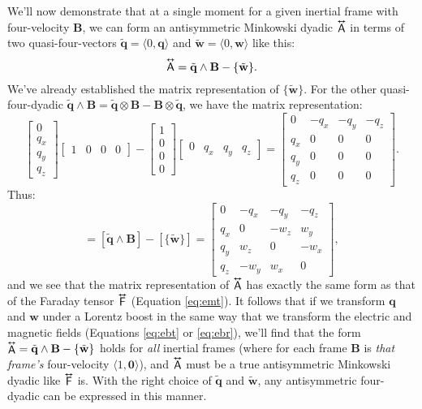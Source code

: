 \documentclass[12pt]{article}
\renewcommand{\vv}[1]{\mathbf{#1}}
\newcommand{\tightoverset}[2]{%
  \mathop{#2}\limits^{\vbox to -.5ex{\kern-0.75ex\hbox{$#1$}\vss}}}
\newcommand{\inlinedy}[1]{\tightoverset{\text{\tiny$\bm\leftrightarrow$}}{#1}}
\newcommand{\capdy}[1]{ \overset{ \text{\tiny$\bm\leftrightarrow$} }{\vphantom{\text{\small{A}}}\smash{#1}} }
\begin{document}
We'll now demonstrate that at a single moment for a given inertial frame with four-velocity $\vv B$, we can form an antisymmetric Minkowski dyadic $\inlinedy{\mathsf{A}}$ in terms of two quasi-four-vectors $\tilde{\vv q} = \langle 0, \vv q \rangle$ and $\tilde{\vv w} = \langle 0, \vv w \rangle$ like this:
\begin{equation*}
\capdy{\mathsf{A}} = \tilde{\vv q} \wedge \vv B - \{ \tilde{\vv w} \}.
\end{equation*}
We've already established the matrix representation of $\{ \tilde{\vv w} \}$. For the other quasi-four-dyadic $\tilde{\vv q} \wedge \vv B = \tilde{\vv q} \otimes \vv B - \vv B \otimes \tilde{\vv q}$, we have the matrix representation:
\begin{equation*}
\begin{bmatrix}
0 \\
q_x \\
q_y \\
q_z
\end{bmatrix}
\begin{bmatrix}
1 & 0 & 0 & 0
\end{bmatrix}
-
\begin{bmatrix}
1 \\
0 \\
0 \\
0
\end{bmatrix}
\begin{bmatrix}
0 & q_x & q_y & q_z
\end{bmatrix}
=
\begin{bmatrix}
0 & -q_x & -q_y & -q_z \\
q_x & 0 & 0 & 0 \\
q_y & 0 & 0 & 0 \\
q_z & 0 & 0 & 0
\end{bmatrix}.
\end{equation*}
Thus:
\begin{equation*}
[\capdy{\mathsf{A}}] = [\tilde{\vv q} \wedge \vv B] - [\{ \tilde{\vv w} \}]
=
\begin{bmatrix}
0 & -q_x & -q_y & -q_z \\[.5ex]
q_x & 0 & -w_z & w_y \\[.5ex]
q_y & w_z & 0 & -w_x \\[.5ex]
q_z & -w_y & w_x & 0
\end{bmatrix},
\end{equation*}
and we see that the matrix representation of $\inlinedy{\mathsf{A}}$ has exactly the same form as that of the Faraday tensor $\inlinedy{\mathsf{F}}$ (Equation \ref{eq:emt}). It follows that if we transform $\vv q$ and $\vv w$ under a Lorentz boost in the same way that we transform the electric and magnetic fields (Equations \ref{eq:ebt} or \ref{eq:ebr}), we'll find that the form $\inlinedy{\mathsf{A}} = \tilde{\vv q} \wedge \vv B - \{ \tilde{\vv w} \}$ holds for \emph{all} inertial frames (where for each frame $\vv B$ is \emph{that frame's} four-velocity $\langle 1, \vv 0 \rangle$), and $\inlinedy{\mathsf{A}}$ must be a true antisymmetric Minkowski dyadic like $\inlinedy{\mathsf{F}}$ is. With the right choice of $\tilde{\vv q}$ and $\tilde{\vv w}$, any antisymmetric four-dyadic can be expressed in this manner.
\end{document}
